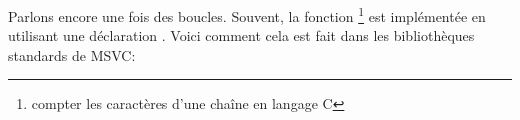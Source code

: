 ﻿Parlons encore une fois des boucles. Souvent, la fonction 
\footnote{compter les caractères d'une chaîne en langage C}
est implémentée en utilisant une déclaration .
Voici comment cela est fait dans les bibliothèques standards de MSVC:
